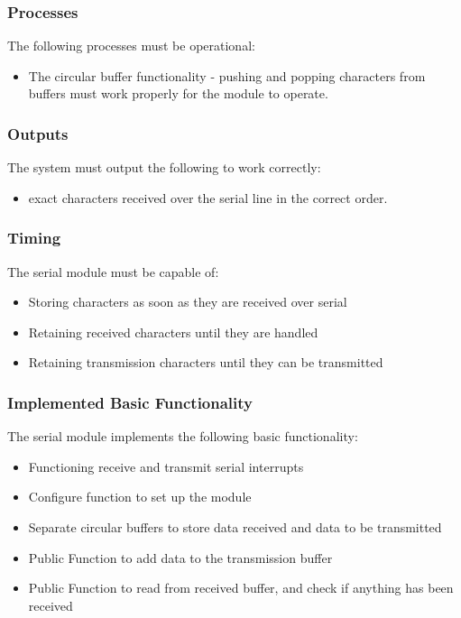 \documentclass[]{report}
\begin{document}
\subsubsection{Processes}
The following processes must be operational:
\begin{itemize}
	\item The circular buffer functionality - pushing and popping characters from buffers must work properly for the module to operate.
\end{itemize}


\subsubsection{Outputs}
The system must output the following to work correctly: 
\begin{itemize}
	\item exact characters received over the serial line in the correct order.
\end{itemize}

\subsubsection{Timing}
The serial module must be capable of:
\begin{itemize}
	\item Storing characters as soon as they are received over serial
	\item Retaining received characters until they are handled
	\item Retaining transmission characters until they can be transmitted
\end{itemize}

\subsubsection{Implemented Basic Functionality}
The serial module implements the following basic functionality:
\begin{itemize}
	\item Functioning receive and transmit serial interrupts
	\item Configure function to set up the module
	\item Separate circular buffers to store data received and data to be transmitted
	\item Public Function to add data to the transmission buffer
	\item Public Function to read from received buffer, and check if anything has been received
\end{itemize}
\end{document}
